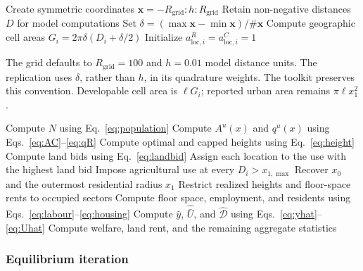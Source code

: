 \documentclass[11pt,a4paper]{article}
\newcommand{\Ubar}{\bar U}
\newcommand{\dens}{\mathcal D}
\begin{document}
\begin{algorithm2e}[H]
\caption{Create the numerical city: \texttt{CREATE\_CITY}}\label{alg:create}
Create symmetric coordinates $\mathbf x=-R_{\mathrm{grid}}:h:R_{\mathrm{grid}}$\;
Retain non-negative distances $D$ for model computations\;
Set $\delta=(\max\mathbf x-\min\mathbf x)/\#\mathbf x$\;
Compute geographic cell areas $G_i=2\pi\delta(D_i+\delta/2)$\;
Initialize $a^R_{\mathrm{loc},i}=a^C_{\mathrm{loc},i}=1$\;
\end{algorithm2e}


\noindent The grid defaults to $R_{\mathrm{grid}}=100$ and $h=0.01$ model distance units. The replication uses $\delta$, rather than $h$, in its quadrature weights. The toolkit preserves this convention. Developable cell area is $\ell G_i$; reported urban area remains $\pi\ell x_1^2$.


\begin{algorithm2e}[H]
\caption{Evaluate endogenous objects: \texttt{SOLVER}}\label{alg:solver}
\KwData{Primitives, \texttt{fund}, guesses $\{y,\Ubar,\dens\}$.}
Compute $N$ using Eq.~\eqref{eq:population}\;
Compute $A^u(x)$ and $q^u(x)$ using Eqs.~\eqref{eq:AC}--\eqref{eq:qR}\;
Compute optimal and capped heights using Eq.~\eqref{eq:height}\;
Compute land bids using Eq.~\eqref{eq:landbid}\;
Assign each location to the use with the highest land bid\;
Impose agricultural use at every $D_i>x_{1,\max}$\;
Recover $x_0$ and the outermost residential radius $x_1$\;
Restrict realized heights and floor-space rents to occupied sectors\;
Compute floor space, employment, and residents using Eqs.~\eqref{eq:labour}--\eqref{eq:housing}\;
Compute $\hat y$, $\widehat{\Ubar}$, and $\widehat{\dens}$ using Eqs.~\eqref{eq:yhat}--\eqref{eq:Uhat}\;
Compute welfare, land rent, and the remaining aggregate statistics\;
\end{algorithm2e}

\clearpage
\subsubsection{Equilibrium iteration}
\end{document}
